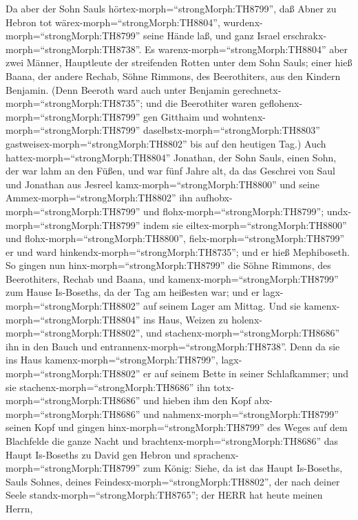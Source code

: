  Da aber der Sohn Sauls hörtex-morph=``strongMorph:TH8799'',
daß Abner zu Hebron tot wärex-morph=``strongMorph:TH8804'',
wurdenx-morph=``strongMorph:TH8799'' seine Hände laß, und ganz Israel
erschrakx-morph=``strongMorph:TH8738''.  Es
warenx-morph=``strongMorph:TH8804'' aber zwei Männer, Hauptleute der
streifenden Rotten unter dem Sohn Sauls; einer hieß Baana, der andere
Rechab, Söhne Rimmons, des Beerothiters, aus den Kindern Benjamin. (Denn
Beeroth ward auch unter Benjamin
gerechnetx-morph=``strongMorph:TH8735'';  und die
Beerothiter waren geflohenx-morph=``strongMorph:TH8799'' gen Gitthaim
und wohntenx-morph=``strongMorph:TH8799''
daselbst\textbar x-morph=``strongMorph:TH8803''
gastweisex-morph=``strongMorph:TH8802'' bis auf den heutigen Tag.)
 Auch hattex-morph=``strongMorph:TH8804'' Jonathan, der Sohn
Sauls, einen Sohn, der war lahm an den Füßen, und war fünf Jahre alt, da
das Geschrei von Saul und Jonathan aus Jesreel
kamx-morph=``strongMorph:TH8800'' und seine
Ammex-morph=``strongMorph:TH8802'' ihn
aufhobx-morph=``strongMorph:TH8799'' und
flohx-morph=``strongMorph:TH8799''; undx-morph=``strongMorph:TH8799''
indem sie eiltex-morph=``strongMorph:TH8800'' und
flohx-morph=``strongMorph:TH8800'', fielx-morph=``strongMorph:TH8799''
er und ward hinkendx-morph=``strongMorph:TH8735''; und er hieß
Mephiboseth.  So gingen nun
hinx-morph=``strongMorph:TH8799'' die Söhne Rimmons, des Beerothiters,
Rechab und Baana, und kamenx-morph=``strongMorph:TH8799'' zum Hause
Is-Boseths, da der Tag am heißesten war; und er
lagx-morph=``strongMorph:TH8802'' auf seinem Lager am Mittag.
 Und sie kamenx-morph=``strongMorph:TH8804'' ins Haus,
Weizen zu holenx-morph=``strongMorph:TH8802'', und
stachenx-morph=``strongMorph:TH8686'' ihn in den Bauch und
entrannenx-morph=``strongMorph:TH8738''.  Denn da sie ins
Haus kamenx-morph=``strongMorph:TH8799'',
lagx-morph=``strongMorph:TH8802'' er auf seinem Bette in seiner
Schlafkammer; und sie stachenx-morph=``strongMorph:TH8686'' ihn
totx-morph=``strongMorph:TH8686'' und hieben ihm den Kopf
abx-morph=``strongMorph:TH8686'' und
nahmenx-morph=``strongMorph:TH8799'' seinen Kopf und gingen
hinx-morph=``strongMorph:TH8799'' des Weges auf dem Blachfelde die ganze
Nacht  und brachtenx-morph=``strongMorph:TH8686'' das Haupt
Is-Boseths zu David gen Hebron und
sprachenx-morph=``strongMorph:TH8799'' zum König: Siehe, da ist das
Haupt Is-Boseths, Sauls Sohnes, deines
Feindesx-morph=``strongMorph:TH8802'', der nach deiner Seele
standx-morph=``strongMorph:TH8765''; der HERR hat heute meinen Herrn,
